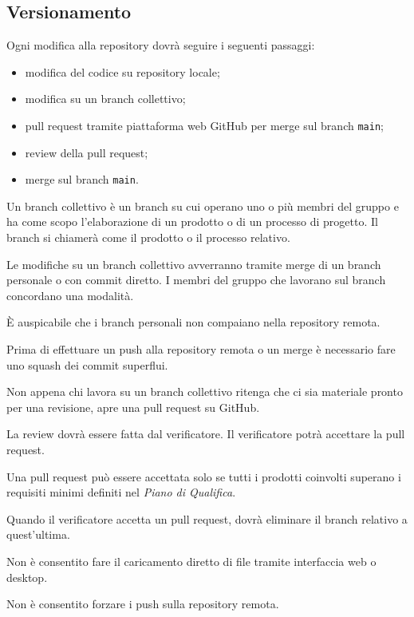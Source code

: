 \documentclass[a4paper, 12pt]{article}
\begin{document}
\subsection{Versionamento}

Ogni modifica alla repository dovrà seguire i seguenti passaggi:
\begin{itemize}
\item modifica del codice su repository locale;
\item modifica su un branch collettivo;
\item pull request tramite piattaforma web GitHub per merge sul branch \texttt{main};
\item review della pull request;
\item merge sul branch \texttt{main}.
\end{itemize}

Un branch collettivo è un branch su cui operano uno o più membri del gruppo e ha come scopo l'elaborazione di un prodotto o di un processo di progetto. Il branch si chiamerà come il prodotto o il processo relativo.

Le modifiche su un branch collettivo avverranno tramite merge di un branch personale o con commit diretto. I membri del gruppo che lavorano sul branch concordano una modalità.

È auspicabile che i branch personali non compaiano nella repository remota.

Prima di effettuare un push alla repository remota o un merge è necessario fare uno squash dei commit superflui.

Non appena chi lavora su un branch collettivo ritenga che ci sia materiale pronto per una revisione, apre una pull request su GitHub.

La review dovrà essere fatta dal verificatore. Il verificatore potrà accettare la pull request.

Una pull request può essere accettata solo se tutti i prodotti coinvolti superano i requisiti minimi definiti nel \textit{Piano di Qualifica}.

Quando il verificatore accetta un pull request, dovrà eliminare il branch relativo a quest'ultima.

Non è consentito fare il caricamento diretto di file tramite interfaccia web o desktop.

Non è consentito forzare i push sulla repository remota.
\end{document}
